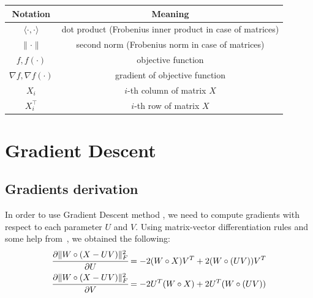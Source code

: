 \documentclass{article}
\begin{document}
 {
  \renewcommand{\arraystretch}{1.5}
  \renewcommand{\tabcolsep}{10pt}
  \begin{table}[hbthbt]
    \centering
    \begin{tabular}{cc}
      \toprule
      \textbf{Notation}              & \textbf{Meaning}                                          \\
      \midrule
      $\langle \cdot, \cdot \rangle$ & dot product (Frobenius inner product in case of matrices) \\
      $\| \cdot \|$                  & second norm (Frobenius norm in case of matrices)          \\
      $f, f(\cdot)$                  & objective function                                        \\
      $\nabla f, \nabla f(\cdot)$    & gradient of objective function                            \\
      $X_i$                          & $i$-th column of matrix $X$                               \\
      $X^\top_i$                     & $i$-th row of matrix $X$                                  \\
      \bottomrule
    \end{tabular}
  \end{table}
 }

\section{Gradient Descent}\label{sec:gradient_descent}

\subsection{Gradients derivation}

In order to use Gradient Descent method , we need to compute gradients with respect to each parameter $U$ and $V$.
Using matrix-vector differentiation rules and some help from~\cite{kwan}, we obtained the following:
\begin{equation}\label{eq:grads}
  \begin{aligned}
     & \cfrac{\partial \|W \circ (X - UV)\|^2_F}{\partial U} = -2 (W \circ X) V^T + 2 (W \circ (UV)) V^T \\
     & \cfrac{\partial \|W \circ (X - UV)\|^2_F}{\partial V} = -2 U^T (W \circ X) + 2 U^T (W \circ (UV)) \\
  \end{aligned}
\end{equation}
\end{document}
